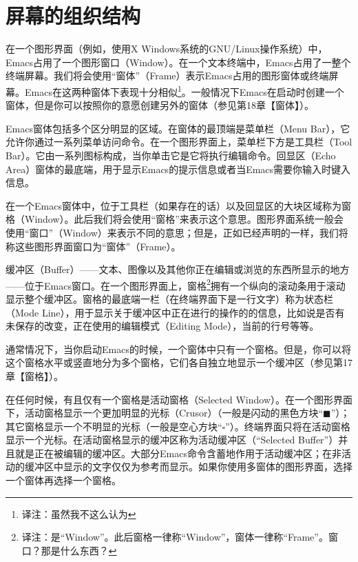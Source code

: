 \chapter{屏幕的组织结构}
在一个图形界面（例如，使用X Windows系统的GNU/Linux操作系统）中，Emacs占用了一个图形窗口（Window）。在一个文本终端中，Emacs占用了一整个终端屏幕。我们将会使用“窗体”（Frame）表示Emacs占用的图形窗体或终端屏幕。Emacs在这两种窗体下表现十分相似\footnote{译注：虽然我不这么认为}。一般情况下Emacs在启动时创建一个窗体，但是你可以按照你的意愿创建另外的窗体（参见第18章【窗体】）。\par
Emacs窗体包括多个区分明显的区域。在窗体的最顶端是菜单栏（Menu Bar），它允许你通过一系列菜单访问命令。在一个图形界面上，菜单栏下方是工具栏（Tool Bar）。它由一系列图标构成，当你单击它是它将执行编辑命令。回显区（Echo Area）窗体的最底端，用于显示Emacs的提示信息或者当Emacs需要你输入时键入信息。\par
在一个Emacs窗体中，位于工具栏（如果存在的话）以及回显区的大块区域称为窗格（Window）。此后我们将会使用“窗格”来表示这个意思。图形界面系统一般会使用“窗口”（Window）来表示不同的意思；但是，正如已经声明的一样，我们将称这些图形界面窗口为“窗体”（Frame）。\par
缓冲区（Buffer）——文本、图像以及其他你正在编辑或浏览的东西所显示的地方——位于Emacs窗口。在一个图形界面上，窗格\footnote{译注：是“Window”。此后窗格一律称“Window”，窗体一律称“Frame”。窗口？那是什么东西？}拥有一个纵向的滚动条用于滚动显示整个缓冲区。窗格的最底端一栏（在终端界面下是一行文字）称为状态栏（Mode Line），用于显示关于缓冲区中正在进行的操作的的信息，比如说是否有未保存的改变，正在使用的编辑模式（Editing Mode），当前的行号等等。\par
通常情况下，当你启动Emacs的时候，一个窗体中只有一个窗格。但是，你可以将这个窗格水平或竖直地分为多个窗格，它们各自独立地显示一个缓冲区（参见第17章【窗格】）。\par
在任何时候，有且仅有一个窗格是活动窗格（Selected Window）。在一个图形界面下，活动窗格显示一个更加明显的光标（Crusor）（一般是闪动的黑色方块“$\blacksquare$”）；其它窗格显示一个不明显的光标（一般是空心方块“$\square$”）。终端界面只将在活动窗格显示一个光标。在活动窗格显示的缓冲区称为活动缓冲区（“Selected Buffer”）并且就是正在被编辑的缓冲区。大部分Emacs命令含蓄地作用于活动缓冲区；在非活动的缓冲区中显示的文字仅仅为参考而显示。如果你使用多窗体的图形界面，选择一个窗体再选择一个窗格。